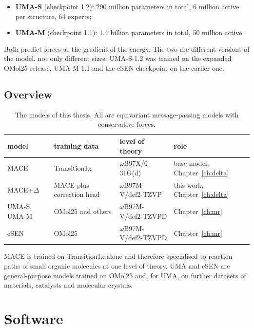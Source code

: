 \begin{itemize}
  \item \textbf{UMA-S} (checkpoint 1.2): 290 million parameters in
    total, 6 million active per structure, 64 experts;
  \item \textbf{UMA-M} (checkpoint 1.1): 1.4 billion parameters in
    total, 50 million active.
\end{itemize}

Both predict forces as the gradient of the energy. The two are
different versions of the model, not only different sizes: UMA-S-1.2 was
trained on the expanded OMol25 release, UMA-M-1.1 and the eSEN
checkpoint on the earlier one.

\subsection{Overview}
\label{sec:mlip-models}

\begin{table}[h]
\centering
\caption{The models of this thesis. All are equivariant message-passing
models with conservative forces.}
\label{tab:mlip-models}
\begin{tabular}{@{}llll@{}}
\toprule
model & training data & level of theory & role \\
\midrule
MACE & Transition1x & $\omega$B97X/6-31G(d) & base model, Chapter~\ref{ch:delta} \\
MACE+$\Delta$ & MACE plus correction head & $\omega$B97M-V/def2-TZVP & this work, Chapter~\ref{ch:delta} \\
UMA-S, UMA-M~\cite{uma} & OMol25 and others & $\omega$B97M-V/def2-TZVPD & Chapter~\ref{ch:mr} \\
eSEN~\cite{esen} & OMol25 & $\omega$B97M-V/def2-TZVPD & Chapter~\ref{ch:mr} \\
\bottomrule
\end{tabular}
\end{table}

MACE is trained on Transition1x alone and therefore specialised to reaction
paths of small organic molecules at one level of theory. UMA and eSEN are
general-purpose models trained on OMol25 and, for UMA, on further datasets
of materials, catalysts and molecular crystals.

\section{Software}
\label{sec:background-software}


